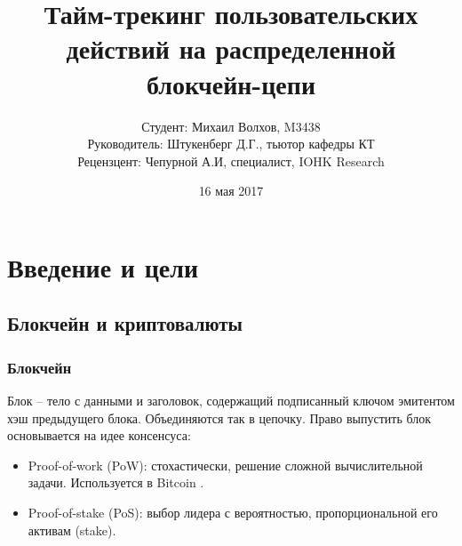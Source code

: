 \documentclass[11pt,handout,pdf,hyperref={unicode}]{beamer}
\title[Тайм-трекинг на блокчейне]{Тайм-трекинг пользовательских действий на распределенной блокчейн-цепи}
\begin{document}
\author[Михаил Волхов, M3438]{
  Студент: Михаил Волхов, M3438\\
  Руководитель: Штукенберг Д.Г., тьютор кафедры КТ \\
  Рецензцент: Чепурной А.И, специалист, IOHK Research
}
\date{16 мая 2017}

\frame{\titlepage}

\section{Введение и цели}

\subsection{Блокчейн и криптовалюты}

\begin{frame}
  \frametitle{Блокчейн}

  Блок -- тело с данными и заголовок, содержащий подписанный ключом
  эмитентом хэш предыдущего блока. Объединяются так в цепочку. Право
  выпустить блок основывается на идее консенсуса:
  \begin{itemize}
  \item Proof-of-work (PoW): стохастически, решение сложной
    вычислительной задачи. Используется в Bitcoin \parencite{bitcoin}.
  \item Proof-of-stake (PoS): выбор лидера с вероятностью,
    пропорциональной его активам (stake).
  \end{itemize}

\end{frame}
\end{document}
